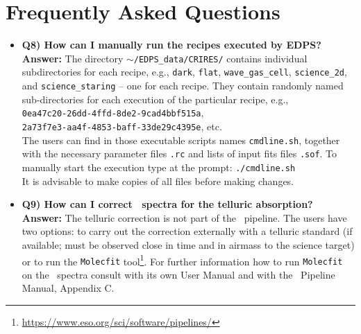 \section{Frequently Asked Questions}
\label{sec:faq}


\begin{itemize}
\item {\bf Q8) How can I manually run the recipes executed by EDPS?}\\
{\bf Answer:} The directory {\tt $\sim$/EDPS\_data/CRIRES/} contains individual subdirectories for each recipe, e.g., {\tt dark}, {\tt flat}, {\tt  wave\_gas\_cell}, {\tt science\_2d}, and {\tt science\_staring} -- one for each recipe. They contain randomly named sub-directories for each execution of the particular recipe, e.g.,\\ 
{\tt 0ea47c20-26dd-4ffd-8de2-9cad4bbf515a},\\ 
{\tt 2a73f7e3-aa4f-4853-baff-33de29c4395e}, etc.\\ 
The users can find in those executable scripts names {\tt cmdline.sh}, together with the necessary parameter files {\tt *.rc} and lists of input fits files {\tt *.sof}. To manually start the execution type at the prompt: {\tt ./cmdline.sh}\\
It is advisable to make copies of all files before making changes.
\end{itemize}

\begin{itemize}
\item {\bf Q9) How can I correct \instname\ spectra for the telluric absorption?}\\
{\bf Answer:} The telluric correction is not part of the \instname\ pipeline. 
The users have two options: to carry out the correction externally with a telluric standard (if available; must be observed close in time and in airmass to the science target) or to run the {\tt Molecfit} tool\footnote{\url{https://www.eso.org/sci/software/pipelines/}}. For further information how to run {\tt Molecfit} on the \instname\ spectra consult with its own User Manual and with the \instname\ Pipeline Manual, Appendix C.
\end{itemize}